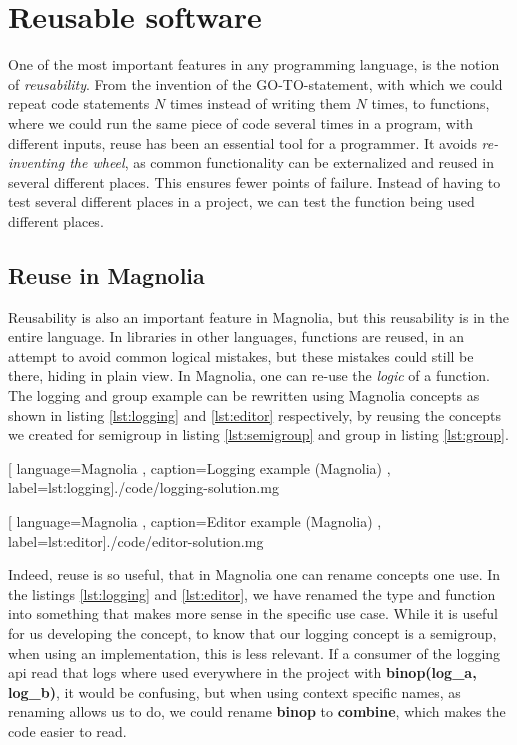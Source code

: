 \section{Reusable software}

One of the most important features in any programming language, is the notion
of \textit{reusability}. From the invention of the GO-TO-statement, with which
we could repeat code statements $N$ times instead of writing them $N$ times, to
functions, where we could run the same piece of code several times in a
program, with different inputs, reuse has been an essential tool for a
programmer. It avoids \textit{re-inventing the wheel}, as common functionality
can be externalized and reused in several different places. This ensures
fewer points of failure. Instead of having to test several different places in
a project, we can test the function being used different places.

\subsection{Reuse in Magnolia}

Reusability is also an important feature in Magnolia, but this reusability is in
the entire language. In libraries in other languages, functions are reused, in
an attempt to avoid common logical mistakes, but these mistakes could still be
there, hiding in plain view. In Magnolia, one can re-use the \textit{logic} of a
function. The logging and group example can be rewritten using Magnolia concepts
as shown in listing \ref{lst:logging} and \ref{lst:editor} respectively, by
reusing the concepts we created for semigroup in listing \ref{lst:semigroup} and group
in listing \ref{lst:group}.

\begin{center}
  
    [ language=Magnolia
    , caption={Logging example (Magnolia)}
    , label=lst:logging]{./code/logging-solution.mg}
\end{center}

\begin{center}
  
    [ language=Magnolia
    , caption={Editor example (Magnolia)}
    , label=lst:editor]{./code/editor-solution.mg}
\end{center}

Indeed, reuse is so useful, that in Magnolia one can rename concepts one use.
In the listings \ref{lst:logging} and \ref{lst:editor}, we have renamed the type
and function into something that makes more sense in the specific use case.
While it is useful for us developing the concept, to know that our logging
concept is a semigroup, when using an implementation, this is less relevant.
If a consumer of the logging \gls*{api} read that logs where used everywhere in
the project with \textbf{binop(log\_a, log\_b)}, it would be confusing, but when
using context specific names, as renaming allows us to do, we could rename
\textbf{binop} to \textbf{combine}, which makes the code easier to read.

